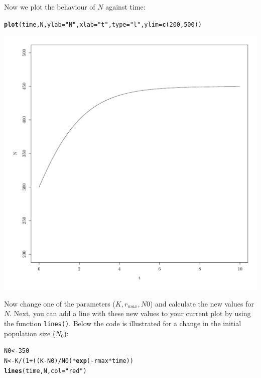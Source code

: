 \documentclass{article}\usepackage[]{graphicx}\usepackage[]{color}
\makeatletter
\def\maxwidth{ %
  \ifdim\Gin@nat@width>\linewidth
    \linewidth
  \else
    \Gin@nat@width
  \fi
}
\newcommand{\hlnum}[1]{\textcolor[rgb]{0.686,0.059,0.569}{#1}}%
\newcommand{\hlstr}[1]{\textcolor[rgb]{0.192,0.494,0.8}{#1}}%
\newcommand{\hlopt}[1]{\textcolor[rgb]{0,0,0}{#1}}%
\newcommand{\hlstd}[1]{\textcolor[rgb]{0.345,0.345,0.345}{#1}}%
\newcommand{\hlkwb}[1]{\textcolor[rgb]{0.69,0.353,0.396}{#1}}%
\newcommand{\hlkwc}[1]{\textcolor[rgb]{0.333,0.667,0.333}{#1}}%
\newcommand{\hlkwd}[1]{\textcolor[rgb]{0.737,0.353,0.396}{\textbf{#1}}}%
\newenvironment{kframe}{%
 \def\at@end@of@kframe{}%
 \ifinner\ifhmode%
  \def\at@end@of@kframe{\end{minipage}}%
  \begin{minipage}{\columnwidth}%
 \fi\fi%
 \def\FrameCommand##1{\hskip\@totalleftmargin \hskip-\fboxsep
 \colorbox{shadecolor}{##1}\hskip-\fboxsep
     \hskip-\linewidth \hskip-\@totalleftmargin \hskip\columnwidth}%
 \MakeFramed {\advance\hsize-\width
   \@totalleftmargin\z@ \linewidth\hsize
   \@setminipage}}%
 {\par\unskip\endMakeFramed%
 \at@end@of@kframe}
\newenvironment{knitrout}{}{} %
\makeatother
\begin{document}
Now we plot the behaviour of $N$ against time:
\begin{knitrout}
\color{fgcolor}\begin{kframe}
\begin{alltt}
\hlkwd{plot}\hlstd{(time,N,}\hlkwc{ylab}\hlstd{=}\hlstr{"N"}\hlstd{,}\hlkwc{xlab}\hlstd{=}\hlstr{"t"}\hlstd{,}\hlkwc{type}\hlstd{=}\hlstr{"l"}\hlstd{,}\hlkwc{ylim}\hlstd{=}\hlkwd{c}\hlstd{(}\hlnum{200}\hlstd{,}\hlnum{500}\hlstd{))}
\end{alltt}
\end{kframe}
\includegraphics[width=\maxwidth]{figure/k9-1} 

\end{knitrout}
Now change one of the parameters ($K,r_{max},N0$) and calculate the new values for $N$. Next, you can add a line with these new values to your current plot by using the function \texttt{lines()}. Below the code is illustrated for a change in the initial population size ($N_0$):
\begin{knitrout}
\color{fgcolor}\begin{kframe}
\begin{alltt}
\hlstd{N0}\hlkwb{<-}\hlnum{350}
\hlstd{N}\hlkwb{<-}\hlstd{K}\hlopt{/}\hlstd{(}\hlnum{1}\hlopt{+}\hlstd{((K}\hlopt{-}\hlstd{N0)}\hlopt{/}\hlstd{N0)}\hlopt{*}\hlkwd{exp}\hlstd{(}\hlopt{-}\hlstd{rmax}\hlopt{*}\hlstd{time))}
\hlkwd{lines}\hlstd{(time,N,}\hlkwc{col}\hlstd{=}\hlstr{"red"}\hlstd{)}
\end{alltt}
\end{kframe}
\end{knitrout}
\end{document}
